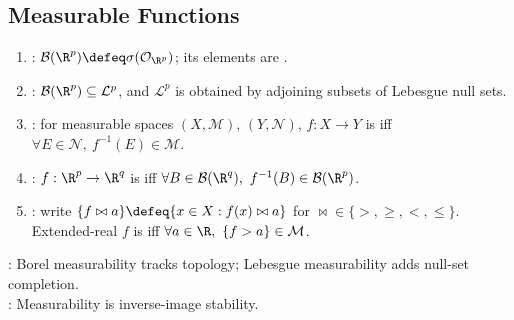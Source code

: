 \subsection{Measurable Functions}

%

\begin{definition} \label{def:measure-space-and-measurable-functions} 
\begin{enumerate}[label=(\roman*)]
\setlength{\itemsep}{0pt}
\item {}: $\mathcal{B}(\R^p)\defeq\sigma(\mathcal{O}_{\R^p})$; its elements are .
\item {}: $\mathcal{B}(\R^p)\subseteq\mathcal{L}^p$, and $\mathcal{L}^p$ is obtained by adjoining subsets of Lebesgue null sets.
\item {}: for measurable spaces $(X,\mathcal{M})$, $(Y,\mathcal{N})$, $f:X\to Y$ is  iff $\forall E\in\mathcal{N},\ f^{-1}(E)\in\mathcal{M}$.
\item {}: $f:\R^p\to\R^q$ is  iff $\forall B\in\mathcal{B}(\R^q),\ f^{-1}(B)\in\mathcal{B}(\R^p)$.
\item {}: write $\{f\bowtie a\}\defeq\{x\in X:f(x)\bowtie a\}$ for $\bowtie\in\{>,\geq,<,\leq\}$.\\
Extended-real $f$ is  iff $\forall a\in\R,\ \{f>a\}\in\mathcal{M}$.
\end{enumerate}
: Borel measurability tracks topology; Lebesgue measurability adds null-set completion.\\
: Measurability is inverse-image stability.
\end{definition}

